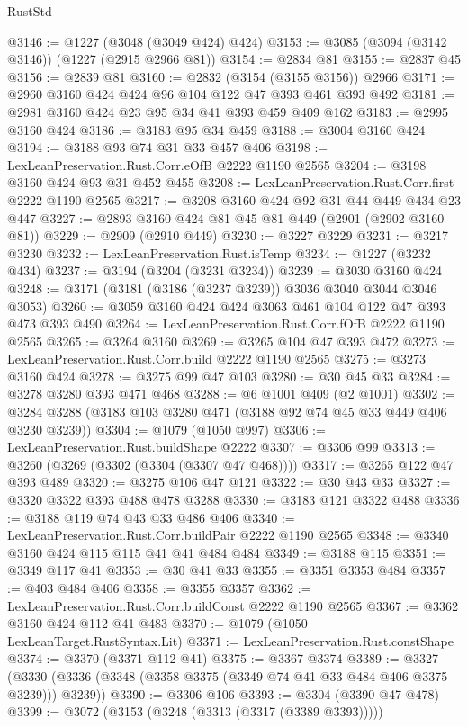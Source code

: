 \begin{lexlean}{RustStd}
\begin{coremodule}
@3146 := @1227 (@3048 (@3049 @424) @424)
@3153 := @3085 (@3094 (@3142 @3146)) (@1227 (@2915 @2966 @81))
@3154 := @2834 @81
@3155 := @2837 @45
@3156 := @2839 @81
@3160 := @2832 (@3154 (@3155 @3156)) @2966
@3171 := @2960 @3160 @424 @424 @96 @104 @122 @47 @393 @461 @393 @492
@3181 := @2981 @3160 @424 @23 @95 @34 @41 @393 @459 @409 @162
@3183 := @2995 @3160 @424
@3186 := @3183 @95 @34 @459
@3188 := @3004 @3160 @424
@3194 := @3188 @93 @74 @31 @33 @457 @406
@3198 := LexLeanPreservation.Rust.Corr.eOfB @2222 @1190 @2565
@3204 := @3198 @3160 @424 @93 @31 @452 @455
@3208 := LexLeanPreservation.Rust.Corr.first @2222 @1190 @2565
@3217 := @3208 @3160 @424 @92 @31 @44 @449 @434 @23 @447
@3227 := @2893 @3160 @424 @81 @45 @81 @449 (@2901 (@2902 @3160 @81))
@3229 := @2909 (@2910 @449)
@3230 := @3227 @3229
@3231 := @3217 @3230
@3232 := LexLeanPreservation.Rust.isTemp
@3234 := @1227 (@3232 @434)
@3237 := @3194 (@3204 (@3231 @3234))
@3239 := @3030 @3160 @424
@3248 := @3171 (@3181 (@3186 (@3237 @3239)) @3036 @3040 @3044 @3046 @3053)
@3260 := @3059 @3160 @424 @424 @3063 @461 @104 @122 @47 @393 @473 @393 @490
@3264 := LexLeanPreservation.Rust.Corr.fOfB @2222 @1190 @2565
@3265 := @3264 @3160
@3269 := @3265 @104 @47 @393 @472
@3273 := LexLeanPreservation.Rust.Corr.build @2222 @1190 @2565
@3275 := @3273 @3160 @424
@3278 := @3275 @99 @47 @103
@3280 := @30 @45 @33
@3284 := @3278 @3280 @393 @471 @468
@3288 := @6 @1001 @409 (@2 @1001)
@3302 := @3284 @3288 (@3183 @103 @3280 @471 (@3188 @92 @74 @45 @33 @449 @406 @3230 @3239))
@3304 := @1079 (@1050 @997)
@3306 := LexLeanPreservation.Rust.buildShape @2222
@3307 := @3306 @99
@3313 := @3260 (@3269 (@3302 (@3304 (@3307 @47 @468))))
@3317 := @3265 @122 @47 @393 @489
@3320 := @3275 @106 @47 @121
@3322 := @30 @43 @33
@3327 := @3320 @3322 @393 @488 @478 @3288
@3330 := @3183 @121 @3322 @488
@3336 := @3188 @119 @74 @43 @33 @486 @406
@3340 := LexLeanPreservation.Rust.Corr.buildPair @2222 @1190 @2565
@3348 := @3340 @3160 @424 @115 @115 @41 @41 @484 @484
@3349 := @3188 @115
@3351 := @3349 @117 @41
@3353 := @30 @41 @33
@3355 := @3351 @3353 @484
@3357 := @403 @484 @406
@3358 := @3355 @3357
@3362 := LexLeanPreservation.Rust.Corr.buildConst @2222 @1190 @2565
@3367 := @3362 @3160 @424 @112 @41 @483
@3370 := @1079 (@1050 LexLeanTarget.RustSyntax.Lit)
@3371 := LexLeanPreservation.Rust.constShape
@3374 := @3370 (@3371 @112 @41)
@3375 := @3367 @3374
@3389 := @3327 (@3330 (@3336 (@3348 (@3358 @3375 (@3349 @74 @41 @33 @484 @406 @3375 @3239))) @3239))
@3390 := @3306 @106
@3393 := @3304 (@3390 @47 @478)
@3399 := @3072 (@3153 (@3248 (@3313 (@3317 (@3389 @3393)))))

\end{coremodule}
\end{lexlean}
